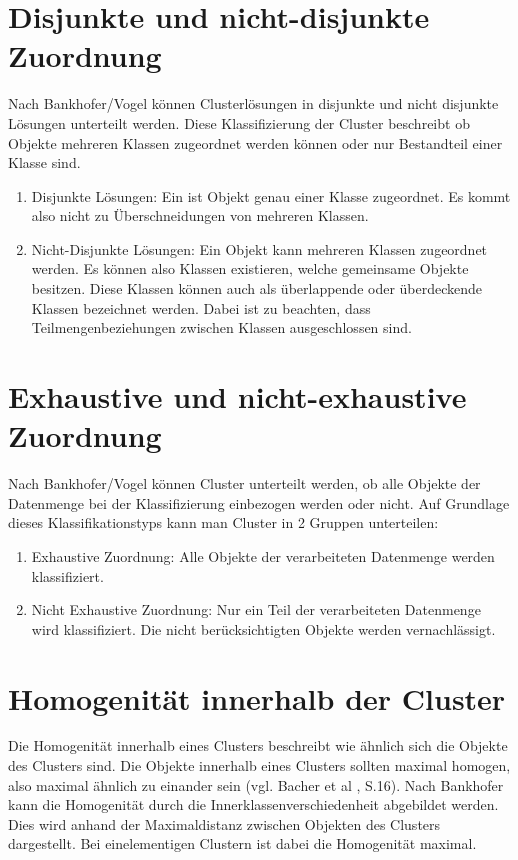 \section{Disjunkte und nicht-disjunkte Zuordnung}
Nach Bankhofer/Vogel \cite{Bankhofer.2008} können Clusterlösungen in disjunkte und nicht disjunkte Lösungen unterteilt werden. Diese Klassifizierung der Cluster beschreibt ob Objekte mehreren Klassen zugeordnet werden können oder nur Bestandteil einer Klasse sind.
\begin{enumerate}
    \item Disjunkte Lösungen: Ein ist Objekt genau einer Klasse zugeordnet. Es kommt also nicht zu Überschneidungen von mehreren Klassen.
    \item Nicht-Disjunkte Lösungen: Ein Objekt kann mehreren Klassen zugeordnet werden. Es können also Klassen existieren, welche gemeinsame Objekte besitzen. Diese Klassen können auch als überlappende oder überdeckende Klassen bezeichnet werden. Dabei ist zu beachten, dass Teilmengenbeziehungen zwischen Klassen ausgeschlossen sind.
\end{enumerate}

\section{Exhaustive und nicht-exhaustive Zuordnung}
Nach Bankhofer/Vogel \cite{Bankhofer.2008} können Cluster unterteilt werden, ob alle Objekte der Datenmenge bei der Klassifizierung einbezogen werden oder nicht. Auf Grundlage dieses Klassifikationstyps kann man Cluster in 2 Gruppen unterteilen:
\begin{enumerate}
    \item Exhaustive Zuordnung: Alle Objekte der verarbeiteten Datenmenge werden klassifiziert.
    \item Nicht Exhaustive Zuordnung: Nur ein Teil der verarbeiteten Datenmenge wird klassifiziert. Die nicht berücksichtigten Objekte werden vernachlässigt.
\end{enumerate}

\section{Homogenität innerhalb der Cluster}
Die Homogenität innerhalb eines Clusters beschreibt wie ähnlich sich die Objekte des Clusters sind. Die Objekte innerhalb eines Clusters sollten maximal homogen, also maximal ähnlich zu einander sein (vgl. Bacher et al \cite{Bacher.2010}, S.16).
Nach Bankhofer \cite{Bankhofer.2008} kann die Homogenität durch die Innerklassenverschiedenheit abgebildet werden. Dies wird anhand der Maximaldistanz zwischen Objekten des Clusters dargestellt. Bei einelementigen Clustern ist dabei die Homogenität maximal.


